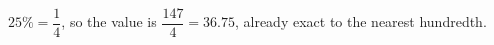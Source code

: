 $25\%=\dfrac{1}{4}$, so the value is $\dfrac{147}{4}=\boxed{36.75}$, already exact to the nearest hundredth.

